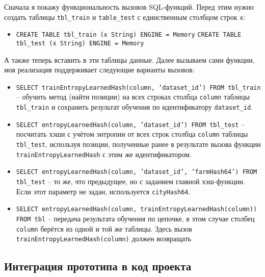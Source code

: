 \documentclass[a4paper,12pt]{extarticle}
\begin{document}
\begin{sloppypar}
Сначала я покажу функциональность вызовов SQL-функций. Перед этим нужно создать таблицы \texttt{tbl\_train} и \texttt{table\_test} с единственным столбцом строк \texttt{x}:

\begin{itemize}
	\item \texttt{CREATE TABLE tbl\_train (x String) ENGINE = Memory} \newline \texttt{CREATE TABLE tbl\_test (x String) ENGINE = Memory}
\end{itemize}

А также теперь вставить в эти таблицы данные. Далее вызываем сами функции, моя реализация поддерживает следующие варианты вызовов:

\begin{itemize}
	\item \texttt{SELECT trainEntropyLearnedHash(column, 'dataset\_id') FROM tbl\_train} -- обучить метод (найти позиции) на всех строках столбца \texttt{column} таблицы \texttt{tbl\_train} и сохранить результат обучения по идентификатору \texttt{dataset\_id}.

	\item \texttt{SELECT entropyLearnedHash(column, 'dataset\_id') FROM tbl\_test} -- посчитать хэши с учётом энтропии от всех строк столбца \texttt{column} таблицы \texttt{tbl\_test}, используя позиции, полученные ранее в результате вызова функции \texttt{trainEntropyLearnedHash} с этим же идентификатором.

	\item \texttt{SELECT entropyLearnedHash(column, 'dataset\_id', 'farmHash64') FROM tbl\_test} -- то же, что предыдущее, но с заданием главной хэш-функции. Если этот параметр не задан, используется \texttt{cityHash64}. 
	
	\item \texttt{SELECT entropyLearnedHash(column, trainEntropyLearnedHash(column)) FROM tbl} -- передача результата обучения по цепочке, в этом случае столбец \texttt{column} берётся из одной и той же таблицы. Здесь вызов \texttt{trainEntropyLearnedHash(column)} должен возвращать
\end{itemize}

\subsection{Интеграция прототипа в код проекта}


\end{sloppypar}
\end{document}
